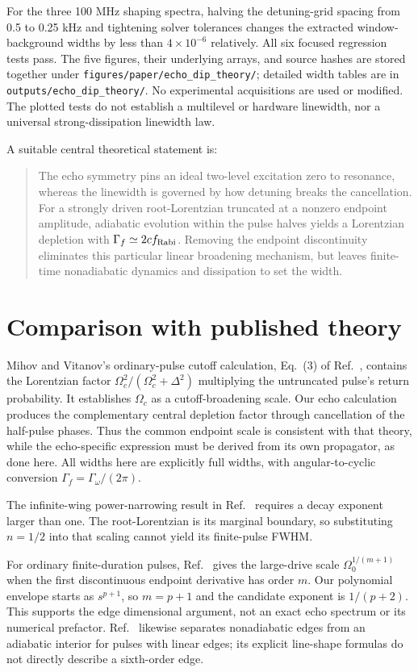\documentclass[11pt]{article}
\newcommand{\Om}{\Omega}
\begin{document}
For the three 100 MHz shaping spectra, halving the detuning-grid spacing
from 0.5 to 0.25 kHz and tightening solver tolerances changes the extracted
window-background widths by less than $4\times10^{-6}$ relatively.
All six focused regression tests pass. The five figures, their underlying
arrays, and source hashes are stored together under
\texttt{figures/paper/echo\_dip\_theory/}; detailed width tables are in
\texttt{outputs/echo\_dip\_theory/}. No experimental acquisitions are
used or modified. The plotted tests do not establish a multilevel or
hardware linewidth, nor a universal strong-dissipation linewidth law.

A suitable central theoretical statement is:
\begin{quote}
The echo symmetry pins an ideal two-level excitation zero to resonance,
whereas the linewidth is governed by how detuning breaks the cancellation.
For a strongly driven root-Lorentzian truncated at a nonzero endpoint
amplitude, adiabatic evolution within the pulse halves yields a Lorentzian
depletion with $\Gamma_f\simeq2c f_{\rm Rabi}$. Removing the endpoint
discontinuity eliminates this particular linear broadening mechanism,
but leaves finite-time nonadiabatic dynamics and dissipation to set the width.
\end{quote}

\section{Comparison with published theory}
Mihov and Vitanov's ordinary-pulse cutoff calculation, Eq.~(3) of
Ref.~\cite{cutoff2024}, contains the Lorentzian factor
$\Om_c^2/(\Om_c^2+\Delta^2)$ multiplying the untruncated pulse's return
probability. It establishes $\Om_c$ as a cutoff-broadening scale.
Our echo calculation produces the complementary central depletion factor
through cancellation of the half-pulse phases. Thus the common endpoint
scale is consistent with that theory, while the echo-specific expression
must be derived from its own propagator, as done here.
All widths here are explicitly full widths, with angular-to-cyclic
conversion $\Gamma_f=\Gamma_\omega/(2\pi)$.

The infinite-wing power-narrowing result in Ref.~\cite{cutoff2024}
requires a decay exponent larger than one. The root-Lorentzian is its
marginal boundary, so substituting $n=1/2$ into that scaling cannot yield
its finite-pulse FWHM.

For ordinary finite-duration pulses, Ref.~\cite{edges2013} gives the
large-drive scale $\Om_0^{1/(m+1)}$ when the first discontinuous endpoint
derivative has order $m$. Our polynomial envelope starts as $s^{p+1}$,
so $m=p+1$ and the candidate exponent is $1/(p+2)$. This supports the
edge dimensional argument, not an exact echo spectrum or its numerical
prefactor. Ref.~\cite{smooth2024} likewise separates nonadiabatic edges
from an adiabatic interior for pulses with linear edges; its explicit
line-shape formulas do not directly describe a sixth-order edge.
\end{document}
